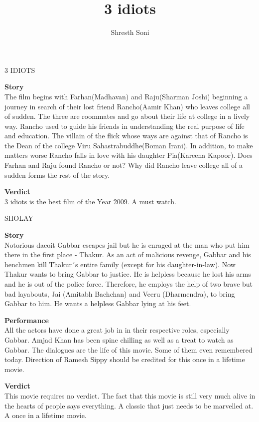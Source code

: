 \documentclass{article}
\title{ 3 idiots}
\author{Shresth Soni}
\begin{document}
\begin{center}
\textmd {\huge 3 IDIOTS}
\end{center}

\begin{flushleft}
\textbf{Story}\\
The film begins with Farhan(Madhavan) and Raju(Sharman Joshi) beginning a journey in search of their lost friend Rancho(Aamir Khan) who leaves college all of sudden. The three are roommates and go about their life at college in a lively way. Rancho used to guide his friends in understanding the real purpose of life and education. The villain of the flick whose ways are against that of Rancho is the Dean of the college Viru Sahastrabuddhe(Boman Irani). In addition, to make matters worse Rancho falls in love with his daughter Pia(Kareena Kapoor). Does Farhan and Raju found Rancho or not? Why did Rancho leave college all of a sudden forms the rest of the story.\\
\vspace{3mm}


\textbf{Verdict}\\
3 idiots is the best film of the Year 2009. A must watch.
\vspace{3mm}

\begin{center}
\textmd {\huge SHOLAY}
\end{center}
\textbf{Story}\\
Notorious dacoit Gabbar escapes jail but he is enraged at the man who put him there in the first place - Thakur. As an act of malicious revenge, Gabbar and his henchmen kill Thakur´s entire family (except for his daughter-in-law). Now Thakur wants to bring Gabbar to justice. He is helpless because he lost his arms and he is out of the police force. Therefore, he employs the help of two brave but bad layabouts, Jai (Amitabh Bachchan) and Veeru (Dharmendra), to bring Gabbar to him. He wants a helpless Gabbar lying at his feet.\\
\vspace{3mm}

\textbf{Performance}\\
All the actors have done a great job in in their respective roles, especially Gabbar. Amjad Khan has been spine chilling as well as a treat to watch as Gabbar. The dialogues are the life of this movie. Some of them even remembered today. Direction of Ramesh Sippy should be credited for this once in a lifetime movie.\\ 
\vspace{3mm}

\textbf{Verdict}\\
This movie requires no verdict. The fact that this movie is still very much alive in the hearts of people says everything. A classic that just needs to be marvelled at. A once in a lifetime movie.\\
\end{flushleft}
\end{document}
